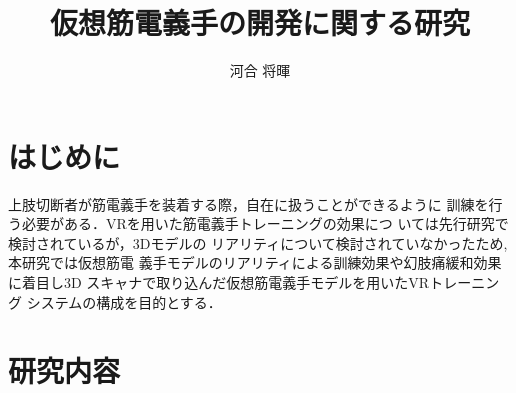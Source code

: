 \documentclass{ltjsarticle}
\title{仮想筋電義手の開発に関する研究}
\author{河合 将暉}
\begin{document}
\maketitle

\section{はじめに}
	上肢切断者が筋電義手を装着する際，自在に扱うことができるように
	訓練を行う必要がある．VRを用いた筋電義手トレーニングの効果につ
	いては先行研究\cite{ref:1}\cite{ref:2}で検討されているが，3Dモデルの
	リアリティについて検討されていなかったため, 本研究では仮想筋電
	義手モデルのリアリティによる訓練効果や幻肢痛緩和効果に着目し3D
	スキャナで取り込んだ仮想筋電義手モデルを用いたVRトレーニング
	システムの構成を目的とする．
	\vspace{-14pt}

\section{研究内容}
\end{document}
